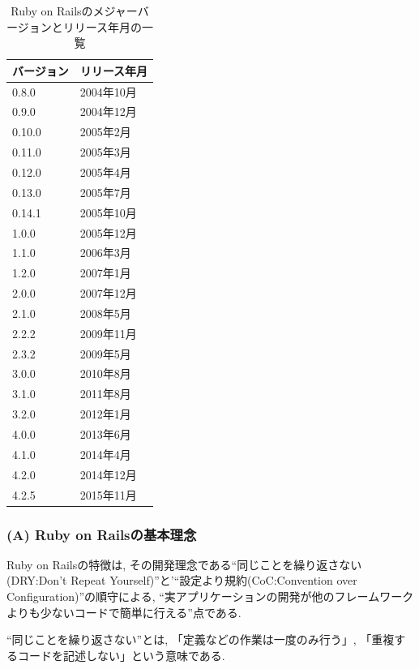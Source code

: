 \begin{table}[htb]
\begin{center}
\begin{tabular}{|l|l|} \hline
バージョン & リリース年月 \\ \hline \hline
0.8.0 & 2004年10月 \\ \hline
0.9.0 & 2004年12月 \\ \hline
0.10.0 & 2005年2月 \\ \hline
0.11.0 & 2005年3月 \\ \hline
0.12.0 & 2005年4月 \\ \hline
0.13.0 & 2005年7月 \\ \hline
0.14.1 & 2005年10月 \\ \hline
1.0.0 & 2005年12月 \\ \hline
1.1.0 & 2006年3月 \\ \hline
1.2.0 & 2007年1月 \\ \hline
2.0.0 & 2007年12月 \\ \hline
2.1.0 & 2008年5月 \\ \hline
2.2.2 & 2009年11月 \\ \hline
2.3.2 & 2009年5月 \\ \hline
3.0.0 & 2010年8月 \\ \hline
3.1.0 & 2011年8月 \\ \hline
3.2.0 & 2012年1月 \\ \hline
4.0.0 & 2013年6月 \\ \hline
4.1.0 & 2014年4月 \\ \hline
4.2.0 & 2014年12月 \\ \hline
4.2.5 & 2015年11月 \\ \hline
\end{tabular}
\caption{Ruby on Railsのメジャーバージョンとリリース年月の一覧}
\end{center}
\end{table}

\subsubsection{(A) Ruby on Railsの基本理念}
Ruby on Railsの特徴は, その開発理念である“同じことを繰り返さない(DRY:Don't Repeat Yourself)”と'“設定より規約(CoC:Convention over Configuration)”の順守による, “実アプリケーションの開発が他のフレームワークよりも少ないコードで簡単に行える”点である.

“同じことを繰り返さない”とは, 「定義などの作業は一度のみ行う」, 「重複するコードを記述しない」という意味である.

